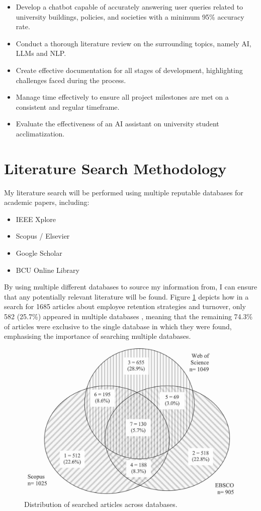 \documentclass[12pt]{report}
\begin{document}
    \begin{itemize}
        \item Develop a chatbot capable of accurately answering user queries related to university 
        buildings, policies, and societies with a minimum 95\% accuracy rate.
        \item Conduct a thorough literature review on the surrounding topics, namely AI, LLMs and NLP.
        \item Create effective documentation for all stages of development, highlighting challenges faced during the process.
        \item Manage time effectively to ensure all project milestones are met on a consistent and regular timeframe.
        \item Evaluate the effectiveness of an AI assistant on university student acclimatization.
    \end{itemize}

    \pagebreak %

    \section{Literature Search Methodology}

    \noindent 
    My literature search will be performed using multiple reputable databases for academic papers, including:
    \begin{itemize}
        \item IEEE Xplore
        \item Scopus / Elsevier
        \item Google Scholar
        \item BCU Online Library
    \end{itemize}
    
    \noindent By using multiple different databases to source my information from, I can ensure that
    any potentially relevant literature will be found. Figure \ref{fig:litSearch} depicts 
    how in a search for 1685 articles about employee retention strategies and turnover, only 582 (25.7\%) appeared in multiple databases
    \autocite{litSearch}, meaning that the remaining 74.3\% of articles were exclusive to the single 
    database in which they were found, emphasising the importance of searching multiple databases.  

    \begin{figure}[H]
        \centering
        \includegraphics[width=.5\linewidth]{litSearchDBs.jpg}
        \caption{Distribution of searched articles across databases. \autocite{litSearch}}
        \label{fig:litSearch}
    \end{figure}
   
\end{document}
